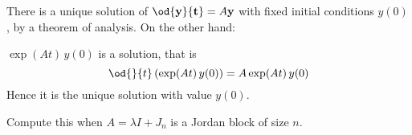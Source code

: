 	There is a unique solution of $\od{\bf{y}}{t} = A\bf{y}$ with fixed initial conditions $y(0)$, by a theorem of analysis. On the other hand:


\begin{exercise}
	$\exp(At)\,y(0)$ is a solution, that is
	\begin{equation*}
		\od{}{t}\left( \exp(At)\,y(0) \right)=A\exp(At)\,y(0)
	\end{equation*}
	Hence it is the unique solution with value $y(0)$.
	
	Compute this when $A=\lambda I + J_n$ is a Jordan block of size $n$.
\end{exercise}

